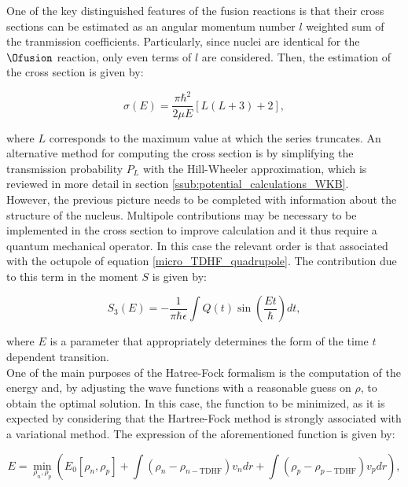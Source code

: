 \documentclass[openany]{book}
\begin{document}
One of the key distinguished features of the fusion reactions is that their cross sections can be estimated as an angular momentum number $l$ weighted sum of the tranmission coefficients. Particularly, since nuclei are identical for the $\Ofusion$ reaction, only even terms of $l$ are considered. Then, the estimation of the cross section is given by: 

\begin{equation}
	\sigma(E) = \frac{\pi \hbar^2}{2 \mu E} [L (L + 3 ) + 2],
\end{equation}

where $L$ corresponds to the maximum value at which the series truncates. An alternative method for computing the cross section is by simplifying the transmission probability $P_L$ with the Hill-Wheeler approximation, which is reviewed in more detail in section \ref{ssub:potential_calculations_WKB}. \\

However, the previous picture needs to be completed with information about the structure of the nucleus. Multipole contributions may be necessary to be implemented in the cross section to improve calculation and it thus require a quantum mechanical operator. In this case the relevant order is that associated with the octupole of equation \ref{micro_TDHF_quadrupole}. The contribution due to this term in the moment $S$ is given by:

\begin{equation}\label{micro_TDHF_quadrupole_calculation}
	S_3(E) = - \frac{1}{\pi\hbar \epsilon} \int Q(t)  \sin{\left( \frac{Et}{\hbar }\right)}dt, 
\end{equation}

where $E$ is a parameter that appropriately determines the form of the time $t$ dependent transition. \\ 

One of the main purposes of the Hatree-Fock formalism is the computation of the energy and, by adjusting the wave functions with a reasonable guess on $\rho$, to obtain the optimal solution. In this case,  the function to be minimized, as it is expected by considering that the Hartree-Fock method is strongly associated with a variational method. The expression of the aforementioned function is given by:

\begin{equation}\label{micro_TDHF_energy}
	E = \min_{\rho_n, \rho_p} \left(E_0[\rho_n, \rho_p] + \int (\rho_n - \rho_{n-\mathrm{TDHF}} )v_n dr +   \int (\rho_p - \rho_{p-\mathrm{TDHF}} )v_p dr \right), 
\end{equation}
\end{document}
